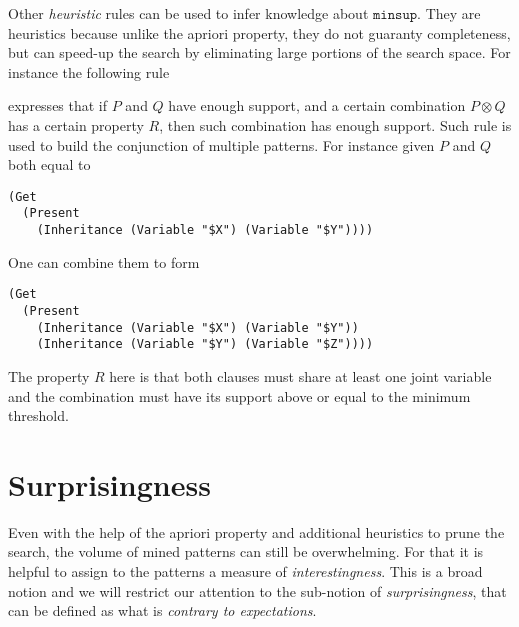 \documentclass[runningheads]{llncs}
\begin{document}
Other \emph{heuristic} rules can be used to infer knowledge about
$\texttt{minsup}$. They are heuristics because unlike the apriori
property, they do not guaranty completeness, but can speed-up the
search by eliminating large portions of the search space. For instance
the following rule
\begin{prooftree}
\end{prooftree}
expresses that if $P$ and $Q$ have enough support, and a certain
combination $P\otimes Q$ has a certain property $R$, then such
combination has enough support. Such rule is used to build the
conjunction of multiple patterns. For instance given $P$ and $Q$ both
equal to
\begin{verbatim}
(Get
  (Present
    (Inheritance (Variable "$X") (Variable "$Y"))))
\end{verbatim}
One can combine them to form
\begin{verbatim}
(Get
  (Present
    (Inheritance (Variable "$X") (Variable "$Y"))
    (Inheritance (Variable "$Y") (Variable "$Z"))))
\end{verbatim}
The property $R$ here is that both clauses must share at least one
joint variable and the combination must have its support above or
equal to the minimum threshold.

\section{Surprisingness}
\label{SUR}

Even with the help of the apriori property and additional heuristics
to prune the search, the volume of mined patterns can still be
overwhelming. For that it is helpful to assign to the patterns a
measure of \emph{interestingness}. This is a broad notion and we will
restrict our attention to the sub-notion of \emph{surprisingness},
that can be defined as what is \emph{contrary to expectations}.
\end{document}
